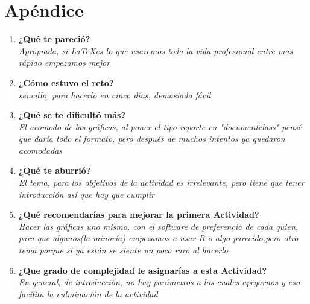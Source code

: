 \documentclass{report}
\begin{document}
\section{Apéndice}

\begin{enumerate}
\item \textbf{¿Qué te pareció?}\\
\textit{Apropiada, si \LaTeX es lo que usaremos toda la vida profesional entre mas rápido empezamos mejor}
\item \textbf{¿Cómo estuvo el reto?}\\
\textit{sencillo, para hacerlo en cinco días, demasiado fácil }
\item \textbf{¿Qué se te dificultó más?} \\
\textit{El acomodo de las gráficas, al poner el tipo reporte en "documentclass" pensé que daría todo el formato, pero después de muchos intentos ya quedaron acomodadas}
\item \textbf{¿Qué te aburrió?}\\
\textit{El tema, para los objetivos de la actividad es irrelevante, pero tiene que tener introducción así que hay que cumplir}
\item \textbf{¿Qué recomendarías para mejorar la primera Actividad?}\\
\textit{Hacer las gráficas uno mismo, con el software de preferencia de cada quien, para que algunos(la minoría) empezamos  a usar R o algo parecido,pero otro tema porque si ya están se siente un poco raro al hacerlo}
\item \textbf{¿Que grado de complejidad le asignarías a esta Actividad?} \\
\textit{En general, de introducción, no hay parámetros a los cuales apegarnos y eso facilita la culminación de la actividad}

\end{enumerate}
\end{document}
